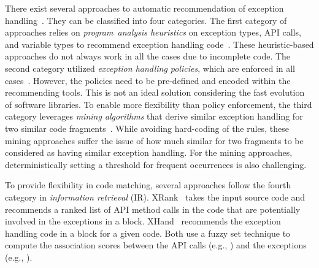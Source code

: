 There exist several approaches to automatic recommendation of
exception
handling~\cite{barbosa-bsse12,chanchal-scam14,barbosa-tse18,barbosa-tse16,xrank-fse20,throw-ase22}. They
can be classified into four categories. The first category of
approaches relies on {\em program~analysis heuristics} on
exception types, API calls, and variable types to recommend exception
handling code~\cite{barbosa-bsse12}. These heuristic-based approaches
do not always work in all the cases due to incomplete code. The second
category utilized {\em exception handling policies}, which are
enforced in all cases~\cite{barbosa-tse16,barbosa-saner18}. However,
the policies need to be pre-defined and encoded within the
recommending tools.  This is not an ideal solution considering the
fast evolution of software libraries. To enable more flexibility than
policy enforcement, the third category leverages {\em mining
  algorithms} that derive similar exception handling for two similar
code fragments~\cite{chanchal-scam14}. While avoiding hard-coding of
the rules, these mining approaches suffer the issue of how much
similar for two fragments to be considered as having similar exception
handling. For the mining approaches, deterministically setting a
threshold for frequent occurrences is also challenging.


To provide flexibility in code matching, several approaches follow the fourth category in {\em information retrieval}
(IR). XRank~\cite{xrank-fse20} takes the input
source code and recommends a ranked list of API method calls in the
code that are potentially involved in the exceptions in a 
block. XHand~\cite{xrank-fse20} recommends the exception handling
code in a  block for a given code. Both use a fuzzy set
technique to compute the association scores between the API calls (e.g.,
) and the exceptions (e.g.,
).


